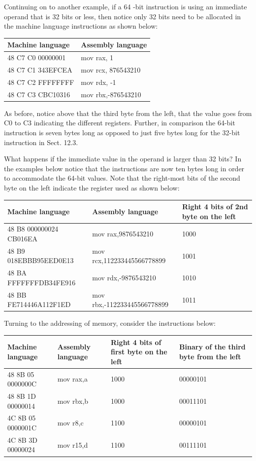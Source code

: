 \documentclass[10pt]{article}
\begin{document}
Continuing on to another example, if a 64 -bit instruction is using an immediate operand that is 32 bits or less, then notice only 32 bits need to be allocated in the machine language instructions as shown below:

\begin{center}
\begin{tabular}{|l|l|}
\hline
Machine language & Assembly language \\
\hline
48 C7 C0 00000001 & mov rax, 1 \\
\hline
48 C7 C1 343EFCEA & mov rcx, 876543210 \\
\hline
48 C7 C2 FFFFFFFF & mov rdx, -1 \\
\hline
48 C7 C3 CBC10316 & mov rbx,-876543210 \\
\hline
\end{tabular}
\end{center}

As before, notice above that the third byte from the left, that the value goes from C0 to C3 indicating the different registers. Further, in comparison the 64-bit instruction is seven bytes long as opposed to just five bytes long for the 32-bit instruction in Sect. 12.3.

What happens if the immediate value in the operand is larger than 32 bits? In the examples below notice that the instructions are now ten bytes long in order to accommodate the 64-bit values. Note that the right-most bits of the second byte on the left indicate the register used as shown below:

\begin{center}
\begin{tabular}{|l|l|l|}
\hline
Machine language & Assembly language & Right 4 bits of 2nd byte on the left \\
\hline
48 B8 000000024 CB016EA & mov rax,9876543210 & 1000 \\
\hline
48 B9 018EBBB95EED0E13 & mov rcx,112233445566778899 & 1001 \\
\hline
48 BA FFFFFFFDB34FE916 & mov rdx,-9876543210 & 1010 \\
\hline
48 BB FE714446A112F1ED & mov rbx,-112233445566778899 & 1011 \\
\hline
\end{tabular}
\end{center}

Turning to the addressing of memory, consider the instructions below:

\begin{center}
\begin{tabular}{|l|l|l|l|}
\hline
Machine language & Assembly language & Right 4 bits of first byte on the left & Binary of the third byte from the left \\
\hline
48 8B 05 0000000C & mov rax,a & 1000 & 00000101 \\
\hline
48 8B 1D 00000014 & mov rbx,b & 1000 & 00011101 \\
\hline
4C 8B 05 0000001C & mov r8,c & 1100 & 00000101 \\
\hline
4C 8B 3D 00000024 & mov r15,d & 1100 & 00111101 \\
\hline
\end{tabular}
\end{center}
\end{document}
